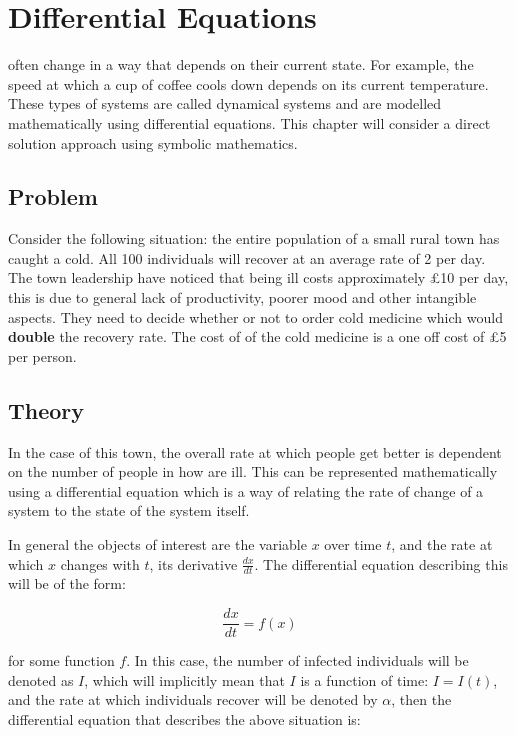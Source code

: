 \chapter[Differential Equations]{Differential Equations}

 often change in a way that depends on their current
state. For example, the speed at which a cup of coffee cools down depends on its
current temperature. These types of systems are called dynamical systems and are
modelled mathematically using differential equations. This chapter will
consider a direct solution approach using symbolic mathematics.

\section{Problem}\label{sec:differential_equations_problem}

Consider the following situation: the entire population of a small rural town
has caught a cold. All 100 individuals will recover at an average rate of 2 per
day. The town leadership have noticed that being ill costs approximately
\pounds10 per day, this is due to general lack of productivity, poorer mood and
other intangible aspects. They need to decide whether or not to order cold
medicine which would \textbf{double} the recovery rate. The cost of of the cold
medicine is a one off cost of \pounds5 per person.

\section{Theory}\label{sec:differential_equations_theory}

In the case of this town, the overall rate at which people get better is
dependent on the number of people in how are ill. This can be represented
mathematically using a differential equation which is a way of relating the rate
of change of a system to the state of the system itself.

In general the objects of interest are the variable \(x\) over time \(t\), and
the rate at which \(x\) changes with \(t\), its derivative \(\frac{dx}{dt}\).
The differential equation describing this will be of the form:

\begin{equation}
    \frac{dx}{dt} = f(x)
\end{equation}

for some function \(f\).
In this case,
the number of infected individuals will be denoted as \(I\), which will
implicitly mean that \(I\) is a function of time: \(I=I(t)\), and the rate at
which individuals recover will be denoted by \(\alpha\), then the
differential equation that describes the above situation is:

